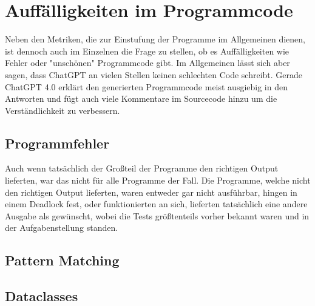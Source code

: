 \documentclass[class=scrbook, crop=false]{standalone}
\begin{document}
\chapter{Auffälligkeiten im Programmcode}
\label{ch::Auffaelligkeiten_im_Programmcode}
    Neben den Metriken, die zur Einstufung der Programme im Allgemeinen dienen, ist dennoch auch im Einzelnen die Frage zu stellen,
    ob es Auffälligkeiten wie Fehler oder "unschönen" Programmcode gibt.
    Im Allgemeinen lässt sich aber sagen, dass ChatGPT an vielen Stellen keinen schlechten Code schreibt.
    Gerade ChatGPT 4.0 erklärt den generierten Programmcode meist ausgiebig in den Antworten und fügt auch viele
    Kommentare im Sourcecode hinzu um die Verständlichkeit zu verbessern.

\section{Programmfehler}
\label{sec:programmfehler}
    Auch wenn tatsächlich der Großteil der Programme den richtigen Output lieferten, war das nicht für alle Programme der Fall.
    Die Programme, welche nicht den richtigen Output lieferten, waren entweder gar nicht ausführbar, hingen in einem Deadlock fest, oder funktionierten an sich,
    lieferten tatsächlich eine andere Ausgabe als gewünscht, wobei die Tests größtenteils vorher bekannt waren und in der Aufgabenstellung standen.

\section{Pattern Matching}
\label{sec:pattern_matching}


\section{Dataclasses}
\label{sec:dataclasses}
\end{document}
